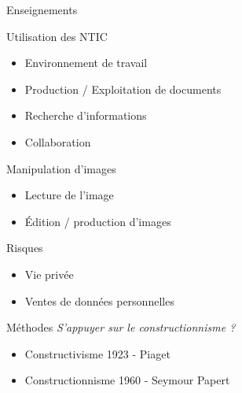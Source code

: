 \begin{frame}{Enseignements}
  \begin{block}{Utilisation des NTIC}
    \begin{itemize}
      \item Environnement de travail
      \item Production / Exploitation de documents
      \item Recherche d'informations
      \item Collaboration
    \end{itemize}
  \end{block}
  \pause
  \begin{block}{Manipulation d'images}
    \begin{itemize}
      \item Lecture de l'image
      \item Édition / production d'images
    \end{itemize}
  \end{block}
  \pause
  \begin{block}{Risques}
    \begin{itemize}
      \item Vie privée
      \item Ventes de données personnelles
    \end{itemize}
  \end{block}
\end{frame}

\begin{frame}{Méthodes}
\vfill
\emph{\huge  S'appuyer sur le constructionnisme ?}
\vfill
\begin{itemize}
  \item Constructivisme 1923 - Piaget
  \item Constructionnisme 1960 - Seymour Papert
\end{itemize}
\vfill
\end{frame}

